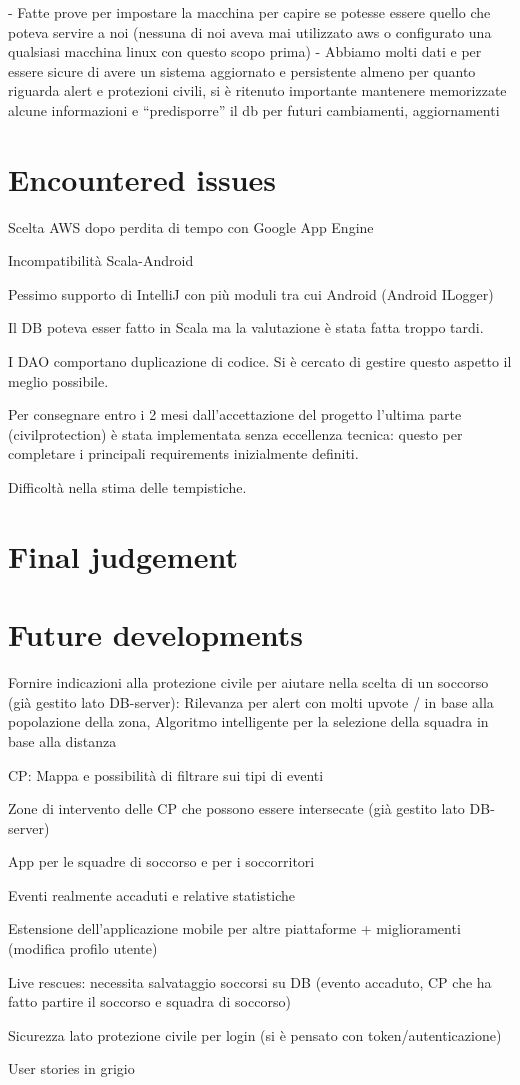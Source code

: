 \documentclass[a4paper,12pt]{report}
\begin{document}
-	Fatte prove per impostare la macchina per capire se potesse essere quello che poteva servire a noi (nessuna di noi aveva mai utilizzato aws o configurato una qualsiasi macchina linux con questo scopo prima)
-	Abbiamo molti dati e per essere sicure di avere un sistema aggiornato e persistente almeno per quanto riguarda alert e protezioni civili, si è ritenuto importante mantenere memorizzate alcune informazioni e “predisporre” il db per futuri cambiamenti, aggiornamenti

\section{Encountered issues}
Scelta AWS dopo perdita di tempo con Google App Engine

Incompatibilità Scala-Android

Pessimo supporto di IntelliJ con più moduli tra cui Android (Android ILogger)

Il DB poteva esser fatto in Scala ma la valutazione è stata fatta troppo tardi.

I DAO comportano duplicazione di codice. Si è cercato di gestire questo aspetto il meglio possibile.

Per consegnare entro i 2 mesi dall'accettazione del progetto l'ultima parte (civilprotection) è stata implementata senza eccellenza tecnica: questo per completare i principali requirements inizialmente definiti.

Difficoltà nella stima delle tempistiche.

\section{Final judgement}

\section{Future developments}
Fornire indicazioni alla protezione civile per aiutare nella scelta di un soccorso (già gestito lato DB-server): Rilevanza per alert con molti upvote / in base alla popolazione della zona, Algoritmo intelligente per la selezione della squadra in base alla distanza

CP: Mappa e possibilità di filtrare sui tipi di eventi

Zone di intervento delle CP che possono essere intersecate (già gestito lato DB-server)

App per le squadre di soccorso e per i soccorritori

Eventi realmente accaduti e relative statistiche

Estensione dell'applicazione mobile per altre piattaforme + miglioramenti (modifica profilo utente)

Live rescues: necessita salvataggio soccorsi su DB (evento accaduto, CP che ha fatto partire il soccorso e squadra di soccorso)

Sicurezza lato protezione civile per login (si è pensato con token/autenticazione)

User stories in grigio
\end{document}
